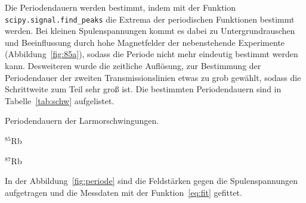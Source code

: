 Die Periodendauern werden bestimmt, indem mit der
Funktion \texttt{scipy.signal.find\_peaks}
die Extrema der periodischen Funktionen bestimmt werden.
Bei kleinen Spulenspannungen kommt es dabei zu Untergrundrauschen und
Beeinflussung durch hohe Magnetfelder der nebenstehende Experimente
(Abbildung~\ref{fig:85a}), sodass die Periode nicht mehr eindeutig
bestimmt werden kann.
Desweiteren wurde die zeitliche Auflösung, zur Bestimmung der Periodendauer
der zweiten Transmissionslinien etwas zu grob gewählt, sodass die
Schrittweite zum Teil sehr groß ist.
Die bestimmten Periodendauern sind in Tabelle~\ref{tab:schw} aufgelistet.
\begin{table}[h]
	\centering
	\caption{Periodendauern der Larmorschwingungen.}%
	\label{tab:schw}
	\begin{subtable}[t]{0.4\textwidth}
	\centering
	\caption{$^{85}$Rb}
		
	\end{subtable}
	\begin{subtable}[t]{0.4\textwidth}
	\centering
	\caption{$^{87}$Rb}
		
	\end{subtable}
\end{table}
In der Abbildung~\ref{fig:periode} sind die Feldstärken gegen die Spulenspannungen
aufgetragen und die Messdaten mit der Funktion~\ref{eq:fit} gefittet.
